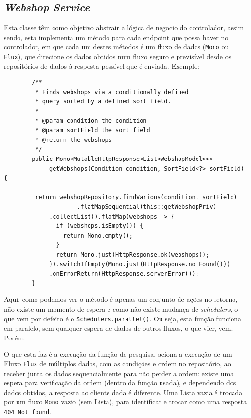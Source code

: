 \newpage

\subsection{\textit{Webshop Service}}

Esta classe têm como objetivo abstrair a lógica de negocio do controlador, assim sendo, esta implementa um método para cada endpoint que possa haver no controlador, em que cada um destes métodos é um fluxo de dados (\texttt{Mono} ou \texttt{Flux}), que direcione os dados obtidos num fluxo seguro e previsível desde os repositórios de dados à resposta possível que é enviada. Exemplo:

\begin{verbatim}
        /**
         * Finds webshops via a conditionally defined
         * query sorted by a defined sort field.
         *
         * @param condition the condition
         * @param sortField the sort field
         * @return the webshops
         */
        public Mono<MutableHttpResponse<List<WebshopModel>>>
             getWebshops(Condition condition, SortField<?> sortField) {
        
         return webshopRepository.findVarious(condition, sortField)
                     .flatMapSequential(this::getWebshopPriv)
             .collectList().flatMap(webshops -> {
               if (webshops.isEmpty()) {
                 return Mono.empty();
               }
               return Mono.just(HttpResponse.ok(webshops));
             }).switchIfEmpty(Mono.just(HttpResponse.notFound()))
             .onErrorReturn(HttpResponse.serverError());
        }
\end{verbatim}

Aqui, como podemos ver o método é apenas um conjunto de ações no retorno, não existe um momento de espera e como não existe mudança de \textit{schedulers}, o que vem por defeito é o \texttt{Schedulers.parallel()}. Ou seja, esta função funciona em paralelo, sem qualquer espera de dados de outros fluxos, o que vier, vem. Porém:

O que esta faz é a execução da função de pesquisa, aciona a execução de um Fluxo \texttt{Flux} de múltiplos dados, com as condições e ordem no repositório, ao receber junta os dados sequencialmente para não perder a ordem: existe uma espera para verificação da ordem (dentro da função usada), e dependendo dos dados obtidos, a resposta ao cliente dada é diferente. Uma Lista vazia é trocada por um fluxo \texttt{Mono} vazio (sem Lista), para identificar e trocar como uma resposta \texttt{404 Not found}.

